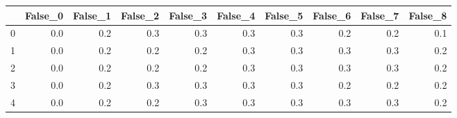 \begin{tabular}{lrrrrrrrrr}
\toprule
{} &  False\_0 &  False\_1 &  False\_2 &  False\_3 &  False\_4 &  False\_5 &  False\_6 &  False\_7 &  False\_8 \\ \hline
\midrule
0 &      0.0 &      0.2 &      0.3 &      0.3 &      0.3 &      0.3 &      0.2 &      0.2 &      0.1 \\ \hline
1 &      0.0 &      0.2 &      0.2 &      0.2 &      0.3 &      0.3 &      0.3 &      0.3 &      0.2 \\ \hline
2 &      0.0 &      0.2 &      0.2 &      0.2 &      0.3 &      0.3 &      0.3 &      0.3 &      0.2 \\ \hline
3 &      0.0 &      0.2 &      0.3 &      0.3 &      0.3 &      0.3 &      0.2 &      0.2 &      0.2 \\ \hline
4 &      0.0 &      0.2 &      0.2 &      0.3 &      0.3 &      0.3 &      0.3 &      0.3 &      0.2 \\ \hline
\bottomrule
\end{tabular}
